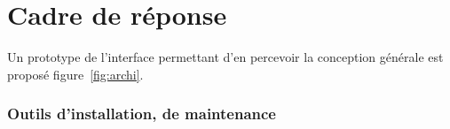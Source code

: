 \section{Cadre de réponse}





%

Un prototype de l'interface permettant d'en percevoir la conception générale est proposé figure~\ref{fig:archi}.

\subsubsection{Outils d’installation, de maintenance}

